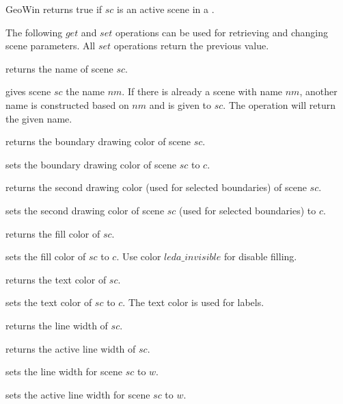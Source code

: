 \begin{ccRefClass}{GeoWin}
{returns true if $sc$ is an active scene in a \ccRefName. }

\medskip
The following $get$ and $set$ operations can be used for retrieving and
changing scene parameters. All $set$ operations return the previous 
value. 
    
{returns the name of scene $sc$. } 

{gives scene $sc$ the name $nm$. If there is already
a scene with name $nm$, another name is constructed
based on $nm$ and is given to $sc$. The operation
will return the given name.
}
  
{returns the boundary drawing color of scene $sc$. }

{sets the boundary drawing color of scene $sc$ to $c$. }

{returns the second drawing color (used for selected
boundaries) of scene $sc$. }

{sets the second drawing color of scene $sc$ (used for selected 
boundaries) to $c$. }

{returns the fill color of $sc$.}

{sets the fill color of $sc$ to $c$. Use color $leda\_invisible$ for
disable filling.}

{returns the text color of $sc$.}

{sets the text color of $sc$ to $c$. The text color is used for labels.}

{returns the line width of $sc$. }

{returns the active line width of $sc$. }

{sets the line width for scene $sc$ to $w$.}
 
{sets the active line width for scene $sc$ to $w$.}


\end{ccRefClass}
